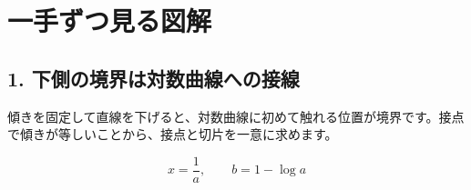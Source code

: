 \documentclass[uplatex,dvipdfmx,11pt]{jsarticle}
\begin{document}
\clearpage

\section*{一手ずつ見る図解}

\subsection*{1. 下側の境界は対数曲線への接線}

傾きを固定して直線を下げると、対数曲線に初めて触れる位置が境界です。接点で傾きが等しいことから、接点と切片を一意に求めます。

\[
x=\frac1{a},\qquad b=1-\log a
\]

\begin{center}


\end{center}
\end{document}

